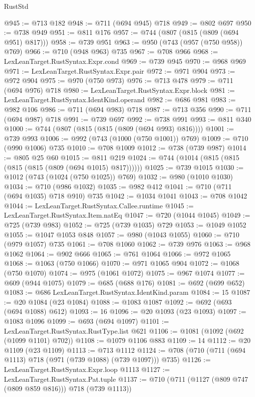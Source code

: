 \begin{lexlean}{RustStd}
\begin{coremodule}
@945 := @713 @182
@948 := @711 (@694 @945) @718
@949 := @802 @697
@950 := @738 @949
@951 := @811 @176
@957 := @744 (@807 (@815 (@809 (@694 @951) @817)))
@958 := @739 @951
@963 := @950 (@743 (@957 (@750 @958)) @769)
@966 := @710 (@948 @963) @735
@967 := @708 @966
@968 := LexLeanTarget.RustSyntax.Expr.cond
@969 := @739 @945
@970 := @968 @969
@971 := LexLeanTarget.RustSyntax.Expr.pair
@972 := @971 @904
@973 := @972 @904
@975 := @970 (@750 @973)
@976 := @713 @478
@979 := @711 (@694 @976) @718
@980 := LexLeanTarget.RustSyntax.Expr.block
@981 := LexLeanTarget.RustSyntax.IdentKind.operand
@982 := @686 @981
@983 := @982 @106
@986 := @711 (@694 @983) @718
@987 := @713 @356
@990 := @711 (@694 @987) @718
@991 := @739 @697
@992 := @738 @991
@993 := @811 @340
@1000 := @744 (@807 (@815 (@815 (@809 (@694 @993) @816))))
@1001 := @739 @993
@1006 := @992 (@743 (@1000 (@750 @1001)) @769)
@1009 := @710 (@990 @1006) @735
@1010 := @708 @1009
@1012 := @738 (@739 @987)
@1014 := @805 @25 @60
@1015 := @811 @219
@1024 := @744 (@1014 (@815 (@815 (@815 (@815 (@809 (@694 @1015) @817))))))
@1025 := @739 @1015
@1030 := @1012 (@743 (@1024 (@750 @1025)) @769)
@1032 := @980 (@1010 @1030)
@1034 := @710 (@986 @1032)
@1035 := @982 @412
@1041 := @710 (@711 (@694 @1035) @718 @910) @735
@1042 := @1034 @1041
@1043 := @708 @1042
@1044 := LexLeanTarget.RustSyntax.Callee.runtime
@1045 := LexLeanTarget.RustSyntax.Item.natEq
@1047 := @720 (@1044 @1045)
@1049 := @725 (@739 @983)
@1052 := @725 (@739 @1035) @729
@1053 := @1049 @1052
@1055 := @1047 @1053 @848
@1057 := @980 (@1043 @1055)
@1060 := @710 (@979 @1057) @735
@1061 := @708 @1060
@1062 := @739 @976
@1063 := @968 @1062
@1064 := @902 @666
@1065 := @761 @1064
@1066 := @972 @1065
@1068 := @1063 (@750 @1066)
@1070 := @971 @1065 @904
@1072 := @1068 (@750 @1070)
@1074 := @975 (@1061 @1072)
@1075 := @967 @1074
@1077 := @609 (@944 @1075)
@1079 := @685 (@688 @176)
@1081 := @692 (@699 @652)
@1083 := @686 LexLeanTarget.RustSyntax.IdentKind.param
@1084 := 15
@1087 := @20 @1084 (@23 @1084)
@1088 := @1083 @1087
@1092 := @692 (@693 (@694 @1088) @612)
@1093 := 16
@1096 := @20 @1093 (@23 @1093)
@1097 := @1083 @1096
@1099 := @693 (@694 @1097)
@1101 := LexLeanTarget.RustSyntax.RustType.list @621
@1106 := @1081 (@1092 (@692 (@1099 @1101) @702))
@1108 := @1079 @1106 @883
@1109 := 14
@1112 := @20 @1109 (@23 @1109)
@1113 := @713 @1112
@1124 := @708 (@710 (@711 (@694 @1113) @718 (@971 (@739 @1088) (@739 @1097))) @735)
@1126 := LexLeanTarget.RustSyntax.Expr.loop @1113
@1127 := LexLeanTarget.RustSyntax.Pat.tuple
@1137 := @710 (@711 (@1127 (@809 @747 (@809 @859 @816))) @718 (@739 @1113))

\end{coremodule}
\end{lexlean}
